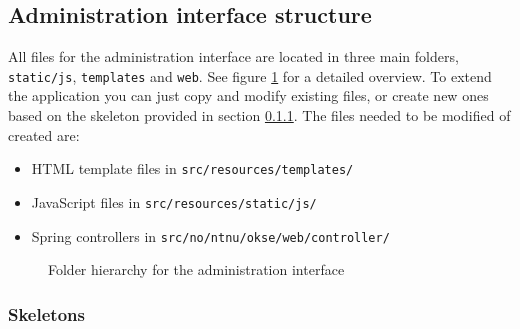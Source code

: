 \subsection{Administration interface structure}

All files for the administration interface are located in three main folders, \verb!static/js!, \verb!templates! and \verb!web!. See figure \ref{fig:oac-folder-hierarchy} for a detailed overview. To extend the application you can just copy and modify existing files, or create new ones based on the skeleton provided in section \ref{subsubsec:skeletons}. The files needed to be modified of created are:

\begin{itemize}
\item HTML template files in \verb!src/resources/templates/!
\item JavaScript files in \verb!src/resources/static/js/!
\item Spring controllers in \verb!src/no/ntnu/okse/web/controller/! 
\end{itemize}

\begin{center}
  \begin{figure}[ht!]
    \caption{Folder hierarchy for the administration interface}
    \label{fig:oac-folder-hierarchy}
  \end{figure}
\end{center}



\subsubsection{Skeletons}
\label{subsubsec:skeletons}

